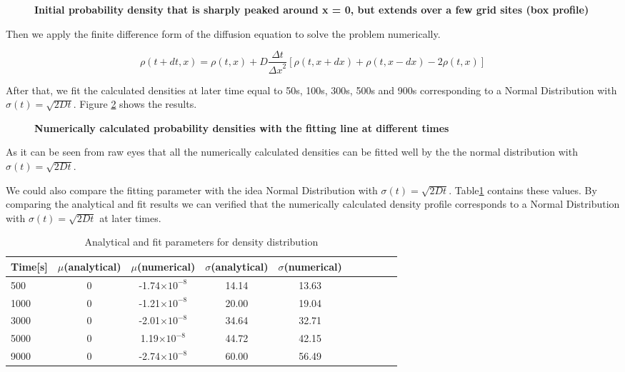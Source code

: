 \documentclass[11pt, oneside]{article}   	%
\begin{document}
\begin{figure}[htbp]
\begin{center}
\caption{{\bf  Initial probability density that is sharply peaked around x = 0, but extends over a few grid sites (box profile)}}
\label{fig1}
\end{center}
\end{figure}

Then we apply the finite difference form of the diffusion equation to solve the problem numerically.

\begin{equation*}
\rho(t+dt,x)=\rho(t,x)+D\frac{\Delta t}{{\Delta x}^2}[\rho(t,x+dx)+\rho(t,x-dx)-2\rho(t,x)]
\end{equation*}

After that, we fit the calculated densities at later time equal to 50s, 100s, 300s, 500s and 900s corresponding to a Normal Distribution with $\sigma(t)=\sqrt{2Dt}$. Figure \ref{fig2} shows the results.

\begin{figure}[htbp]
\begin{center}
\caption{{\bf   Numerically calculated probability densities with the fitting line at different times }}
\label{fig2}
\end{center}
\end{figure}

As it can be seen from raw eyes that all the numerically calculated densities can be fitted well by the the normal distribution with $\sigma(t)=\sqrt{2Dt}$.

We could also compare the fitting parameter with the idea Normal Distribution with $\sigma(t)=\sqrt{2Dt}$. Table\ref{table1} contains these values. By comparing the analytical and fit results we can verified that the numerically calculated density profile corresponds to a Normal Distribution with $\sigma(t)=\sqrt{2Dt}$ at later times. 

\begin{table}[htdp]
\caption{Analytical and fit parameters for density distribution}
\begin{center}
\begin{tabular}{l*{8}{c}r}
Time[s]              & $\mu$(analytical) & $\mu$(numerical)& $\sigma$(analytical) &$\sigma$(numerical)&  \\
\hline
500			&0	& -1.74$\times10^{-8}$ 	&14.14		&13.63  \\
1000			&0	&-1.21$\times10^{-8}$	&20.00		&19.04   \\
3000			&0 	& -2.01$\times10^{-8}$ 	&34.64		&32.71   \\
5000			&0 	& 1.19$\times10^{-8}$ 	&44.72		&42.15  \\
9000			&0 	& -2.74$\times10^{-8}$ 	&60.00		&56.49	\\
\end{tabular}
\end{center}
\label{table1}
\end{table}
\end{document}
